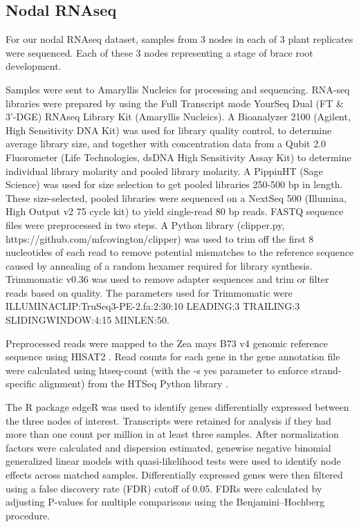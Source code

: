 \subsection{Nodal RNAseq} 
For our nodal RNAseq dataset, samples from 3 nodes in each of 3 plant replicates were sequenced. Each of these 3 nodes representing a stage of brace root development. 


Samples were sent to Amaryllis Nucleics for processing and sequencing. RNA-seq libraries were prepared by using the Full Transcript mode YourSeq Dual (FT \& 3'-DGE) RNAseq Library Kit (Amaryllis Nucleics). A Bioanalyzer 2100 (Agilent, High Sensitivity DNA Kit) was used for library quality control, to determine average library size, and together with concentration data from a Qubit 2.0 Fluorometer (Life Technologies, dsDNA High Sensitivity Assay Kit) to determine individual library molarity and pooled library molarity. A PippinHT (Sage Science) was used for size selection to get pooled libraries 250-500 bp in length. These size-selected, pooled libraries were sequenced on a NextSeq 500 (Illumina, High Output v2 75 cycle kit) to yield single-read 80 bp reads. FASTQ sequence files were preprocessed in two steps. A Python library (clipper.py, https://github.com/mfcovington/clipper) was used to trim off the first 8 nucleotides of each read to remove potential mismatches to the reference sequence caused by annealing of a random hexamer required for library synthesis. Trimmomatic v0.36 \cite{Bolger2014} was used to remove adapter sequences and trim or filter reads based on quality. The parameters used for Trimmomatic were ILLUMINACLIP:TruSeq3-PE-2.fa:2:30:10 LEADING:3 TRAILING:3 SLIDINGWINDOW:4:15 MINLEN:50.

Preprocessed reads were mapped to the Zea mays B73 v4 genomic reference sequence \cite{nihMaysGenome} using HISAT2 \cite{HISAT2}. Read counts for each gene in the gene annotation file \cite{nihMaysGenome} were calculated using htseq-count (with the -s yes parameter to enforce strand-specific alignment) from the HTSeq Python library \cite{Anders2014}.

The R package edgeR \cite{edgeR} was used to identify genes differentially expressed between the three nodes of interest. Transcripts were retained for analysis if they had more than one count per million in at least three samples. After normalization factors were calculated and dispersion estimated, genewise negative binomial generalized linear models with quasi-likelihood tests were used to identify node effects across matched samples. Differentially expressed genes were then filtered using a false discovery rate (FDR) cutoff of 0.05. FDRs were calculated by adjusting P-values for multiple comparisons using the Benjamini–Hochberg procedure.

